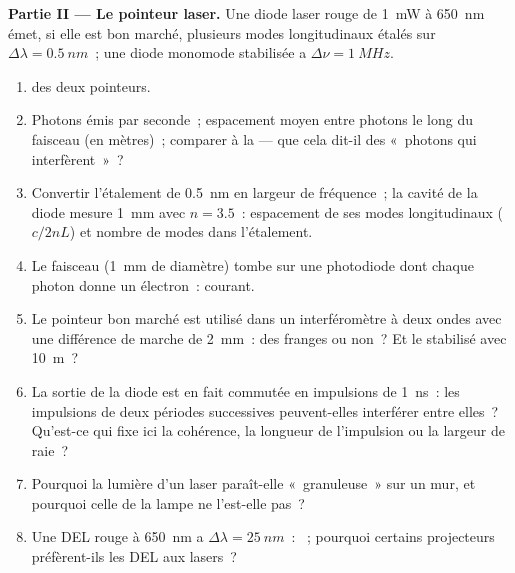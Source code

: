 \begin{problem}
\medskip
\noindent\textbf{Partie II --- Le pointeur laser.}
Une diode laser rouge de \qty{1}{mW} à \qty{650}{nm} émet, si elle est bon marché, plusieurs
modes longitudinaux étalés sur $\Delta\lambda = \qty{0.5}{nm}$~; une diode monomode
stabilisée a $\Delta\nu = \qty{1}{MHz}$.
\begin{enumerate}[resume]
  \item {} des deux pointeurs.
  \item Photons émis par seconde~; espacement moyen entre photons le long
        du faisceau (en mètres)~; comparer à la  ---
        que cela dit-il des «~photons qui interfèrent~»~?
  \item Convertir l'étalement de \qty{0.5}{nm} en largeur de fréquence~; la
        cavité de la diode mesure \qty{1}{mm} avec $n = 3.5$~: espacement de ses
        modes longitudinaux ($c/2nL$) et nombre de modes dans l'étalement.
  \item Le faisceau (\qty{1}{mm} de diamètre) tombe sur une photodiode dont
        chaque photon donne un électron~: courant.
  \item Le pointeur bon marché est utilisé dans un interféromètre à deux ondes avec une
        différence de marche de \qty{2}{mm}~: des franges ou non~? Et le stabilisé
        avec \qty{10}{m}~?
  \item La sortie de la diode est en fait commutée en impulsions de
        \qty{1}{ns}~: les impulsions de deux périodes successives peuvent-elles
        interférer entre elles~? Qu'est-ce qui fixe ici la cohérence, la longueur
        de l'impulsion ou la largeur de raie~?
  \item Pourquoi la lumière d'un laser paraît-elle «~granuleuse~» sur un mur, et pourquoi
        celle de la lampe ne l'est-elle pas~?
  \item Une DEL rouge à \qty{650}{nm} a $\Delta\lambda = \qty{25}{nm}$~: ~; pourquoi certains projecteurs préfèrent-ils les DEL aux lasers~?
\end{enumerate}


\end{problem}
